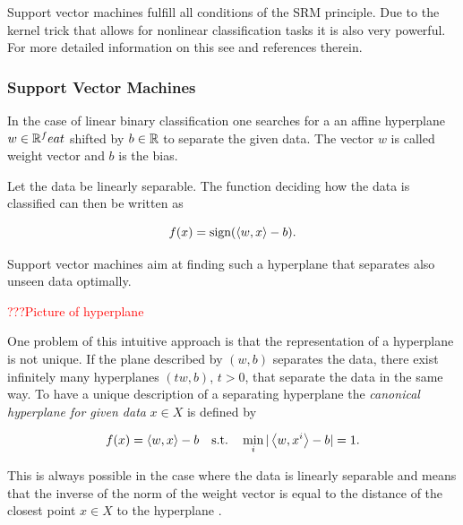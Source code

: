 
Support vector machines fulfill all conditions of the SRM principle. Due to the kernel trick that allows for nonlinear classification tasks it is also very powerful. For more detailed information on this see \cite{Kunapuli2008} and references therein.

\subsubsection{Support Vector Machines}

In the case of linear binary classification one searches for a an affine hyperplane \(w \in \mathbb{R}^feat\) shifted by \(b \in \mathbb{R}\) to separate the given data. The vector \(w\) is called weight vector and \(b\) is the bias.

Let the data be linearly separable. The function deciding how the data is classified can then be written as

\[ f(x) = \text{sign}(\left\langle w,x\right\rangle-b). \]

Support vector machines aim at finding such a hyperplane that separates also unseen data optimally.

\textcolor{red}{???Picture of hyperplane}

One problem of this intuitive approach is that the representation of a hyperplane is not unique. If the plane described by \((w,b)\) separates the data, there exist infinitely many hyperplanes \((tw,b)\), \(t>0\), that separate the data in the same way.
To have a unique description of a separating hyperplane the \emph{canonical hyperplane for given data} \(x \in X\) is defined by 

\[ f(x) = \left\langle w, x\right\rangle - b  \quad \text{s.t.} \quad \min_i \vert\left\langle w,x^i\right\rangle -b\vert = 1.\] 

This is always possible in the case where the data is  linearly separable and means that the inverse of the norm of the weight vector is equal to the distance of the closest point \(x \in X \) to  the hyperplane \cite[p. 10]{Kunapuli2008}.



